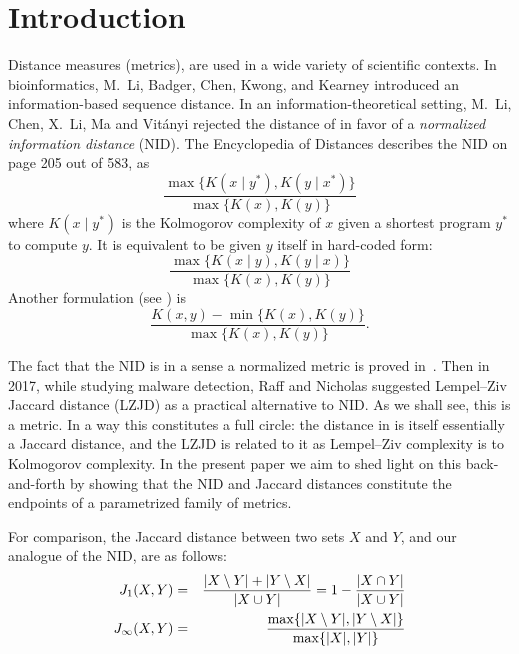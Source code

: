 \section{Introduction}
		Distance measures (metrics), are used in a wide variety of scientific contexts.
		In bioinformatics, M.~Li, Badger, Chen, Kwong, and Kearney \cite{Li2001AnIS} introduced an information-based sequence distance.
		In an information-theoretical setting, M.~Li, Chen, X.~Li, Ma and Vit{\'a}nyi \cite{MR2103495} rejected the distance of \cite{Li2001AnIS} in favor of a
		\emph{normalized information distance} (NID).
		The Encyclopedia of Distances \cite{MR3559482} describes the NID on page 205 out of 583, as
		\[
			\frac{
				\max\{
					K(x\mid y^*),K(y\mid x^*)
				\}
			}{
				\max\{
					K(x),K(y)
				\}
			}
		\]
		where $K(x\mid y^*)$ is the Kolmogorov complexity of $x$ given a shortest program $y^*$ to compute $y$.
		It is equivalent to be given $y$ itself in hard-coded form:
		\[
			\frac{
				\max\{
					K(x\mid y),K(y\mid x)
				\}
			}{
				\max\{
					K(x),K(y)
				\}
			}
		\]
		Another formulation (see \cite[page 8]{MR2103495}) is
		\[
			\frac{K(x,y)-\min\{K(x),K(y)\}}{\max\{K(x),K(y)\}}.
		\]

		The fact that the NID is in a sense a normalized metric is proved in~\cite{MR2103495}.
		Then in 2017, while studying malware detection, Raff and Nicholas \cite{Raff2017AnAT} suggested Lempel--Ziv Jaccard distance (LZJD) as a practical alternative to NID.
		As we shall see, this is a metric.
		In a way this constitutes a full circle: the distance in \cite{Li2001AnIS} is itself essentially a Jaccard distance,
		and the LZJD is related to it as Lempel--Ziv complexity is to Kolmogorov complexity.
		In the present paper we aim to shed light on this back-and-forth by showing that
		the NID and Jaccard distances constitute the endpoints of a parametrized family of metrics.


		For comparison, the Jaccard distance between two sets $X$ and $Y$, and our analogue of the NID, are as follows:
		\begin{eqnarray}
			J_1(X,Y)&=&\frac{\lvert X\setminus Y\rvert+\lvert Y\setminus X\rvert}{\lvert X\cup Y\rvert} = 1 - \frac{\lvert X\cap Y\rvert}{\lvert X\cup Y\rvert}\\
			J_{\infty}(X,Y)&=&\frac{\max\{\lvert X\setminus Y\rvert, \lvert Y\setminus X\rvert\}}{\max\{\lvert X\rvert,\lvert Y\rvert\}}\label{setNID}
		\end{eqnarray}


